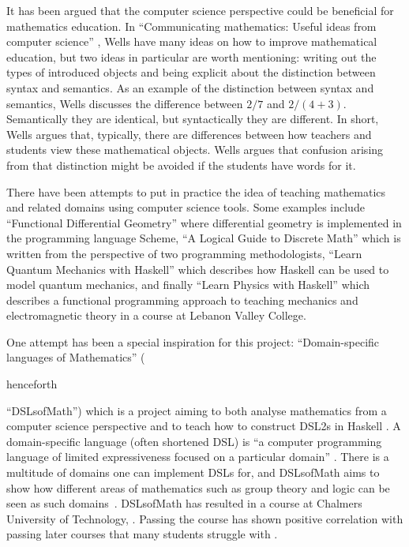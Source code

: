 It has been argued that the computer science perspective could be beneficial for mathematics education. In ``Communicating mathematics: Useful ideas from computer science'' \cite{wells1995communicating}, Wells have many ideas on how to improve mathematical education, but two ideas in particular are worth mentioning: writing out the types of introduced objects and being explicit about the distinction between syntax and semantics. As an example of the distinction between syntax and semantics, Wells discusses the difference between $2/7$ and $2/(4+3)$. Semantically they are identical, but syntactically they are different. In short, Wells argues that, typically, there are differences between how teachers and students view these mathematical objects. Wells argues that confusion arising from that distinction might be avoided if the students have words for it. 

There have been attempts to put in practice the idea of teaching mathematics and related domains using computer science tools. Some examples include ``Functional Differential Geometry'' \cite{sussman2013} where differential geometry is implemented in the programming language Scheme,
``A Logical Guide to Discrete Math'' \cite{gries2013logical} which is written from the perspective of two programming methodologists,
``Learn Quantum Mechanics with Haskell'' \cite{quantumwithhaskell} which describes how \gls{Haskell} can be used to model quantum mechanics, and finally ``Learn Physics with Haskell'' \cite{physicswithhaskell} which describes a functional programming approach to teaching mechanics and electromagnetic theory in a course at Lebanon Valley College. 

One attempt has been a special inspiration for this project: ``Domain-specific languages of Mathematics'' (\begin{newtext}henceforth \end{newtext}``\gls{DSLsofMath}'') which is a project aiming to both analyse mathematics from a computer science perspective and to teach how to construct \gls{DSL2}s in \gls{Haskell} \cite{dslsofmath}. A domain-specific language (often shortened \gls{DSL}) is ``a computer programming language of limited expressiveness focused on a particular domain'' \cite[p.~27]{fowler_parsons_2010}.
There is a multitude of domains one can implement \gls{DSL}s for, and DSLsofMath aims to show how different areas of mathematics such as group theory and logic can be seen as such domains~\cite{dslsofmath}. \gls{DSLsofMath} has resulted in a course at Chalmers University of Technology, . Passing the course has shown positive correlation with passing later courses that many students struggle with \cite{Jansson_2019}. %


